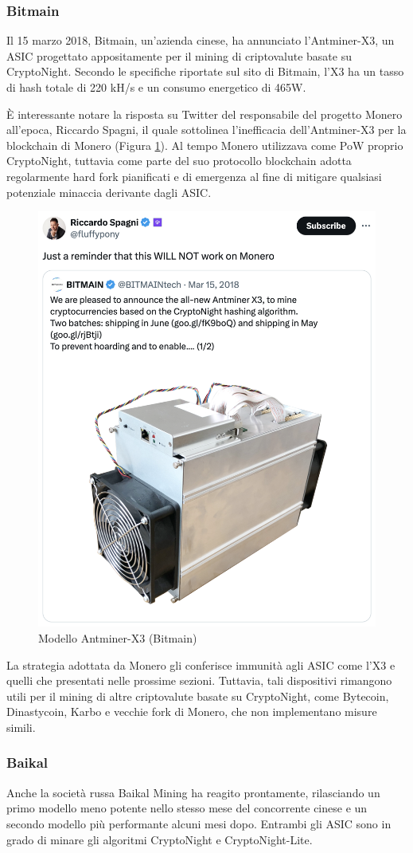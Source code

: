 \subsubsection{Bitmain}
Il 15 marzo 2018, Bitmain, un'azienda cinese, ha annunciato l'Antminer-X3, un ASIC progettato appositamente per il mining di criptovalute basate su CryptoNight. Secondo le specifiche riportate sul sito di Bitmain, l'X3 ha un tasso di hash totale di 220 kH/s e un consumo energetico di 465W.

È interessante notare la risposta su Twitter del responsabile del progetto Monero all'epoca, Riccardo Spagni, il quale sottolinea l'inefficacia dell'Antminer-X3 per la blockchain di Monero (Figura \ref{fig:Antminer-X3}).
Al tempo Monero utilizzava come PoW proprio CryptoNight, tuttavia come parte del suo protocollo blockchain adotta regolarmente hard fork pianificati e di emergenza al fine di mitigare qualsiasi potenziale minaccia derivante dagli ASIC.


\begin{figure}[h!]
    \centering
    \includegraphics[width=0.45\linewidth]{images/Antminer-X3.png}
    \caption{Modello Antminer-X3 (Bitmain)}
    \label{fig:Antminer-X3}
\end{figure}

La strategia adottata da Monero gli conferisce immunità agli ASIC come l'X3 e quelli che presentati nelle prossime sezioni. 
Tuttavia, tali dispositivi rimangono utili per il mining di altre criptovalute basate su CryptoNight, come Bytecoin, Dinastycoin, Karbo e vecchie fork di Monero, che non implementano misure simili.


\subsubsection{Baikal}
Anche la società russa Baikal Mining ha reagito prontamente, rilasciando un primo modello meno potente nello stesso mese del concorrente cinese e un secondo modello più performante alcuni mesi dopo.
Entrambi gli ASIC sono in grado di minare gli algoritmi CryptoNight e CryptoNight-Lite.

